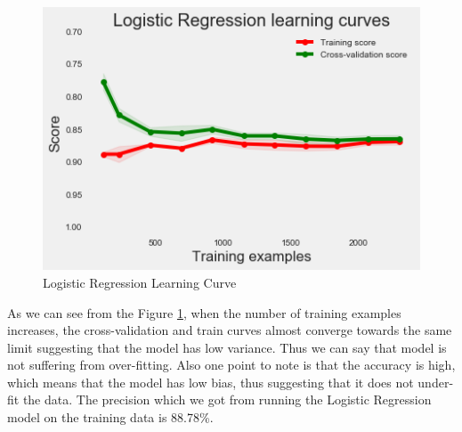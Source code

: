 \begin{figure}
\caption{Logistic Regression Learning Curve}
\label{5.1}
\centering
\includegraphics[width=\columnwidth]{images/5_1.png}
\end{figure}

As we can see from the Figure \ref{5.1}, when the number of training examples increases, the cross-validation and train curves almost converge towards the same limit suggesting that the model has low variance. Thus we can say that model is not suffering from over-fitting. Also one point to note is that the accuracy is high, which means that the model has low bias, thus suggesting that it does not under-fit the data. The precision which we got from running the Logistic Regression model on the training data is 88.78\%.

